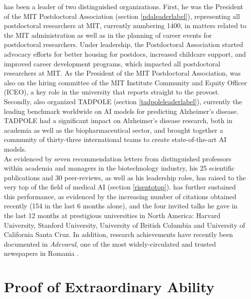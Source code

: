 \documentclass[11pt]{article}
\begin{document}
\dr has been a leader of two distinguished organizations. First, he was the President of the MIT Postdoctoral Association (section \ref{pdaleaderlabel}), representing all postdoctoral researchers at MIT, currently numbering 1400, in matters related to the MIT administration as well as in the planning of career events for postdoctoral researchers. Under \drs leadership, the Postdoctoral Association started advocacy efforts for better housing for postdocs, increased childcare support, and improved career development programs, which impacted all postdoctoral researchers at MIT. As the President of the MIT Postdoctoral Association, \dr was also on the hiring committee of the MIT Institute Community and Equity Officer (ICEO), a key role in the university that reports straight to the provost. Secondly, \dr also organized TADPOLE (section \ref{tadpoleleaderlabel}), currently the leading benchmark worldwide on AI models for predicting Alzheimer's disease. TADPOLE had a significant impact on Alzheimer's disease research, both in academia as well as the biopharmaceutical sector, and brought together a community of thirty-three international teams to create state-of-the-art AI models. \\

As evidenced by seven recommendation letters from distinguished professors within academia and managers in the biotechnology industry, his 25 scientific publications and 30 peer-reviews, as well as his leadership roles, \dr has raised to the very top of the field of medical AI (section \ref{risentotop}). \dr has further sustained this performance, as evidenced by the increasing number of citations obtained recently (154 in the last 6 months alone), and the four invited talks he gave in the last 12 months at prestigious universities in North America: Harvard University, Stanford University, University of British Columbia and University of California Santa Cruz. In addition, \drs research achievements have recently been documented in \emph{Adevarul}, one of the most widely-circulated and trusted newspapers in Romania \cite{adevarul}. 


\section{Proof of \drs Extraordinary Ability}


%
\end{document}
